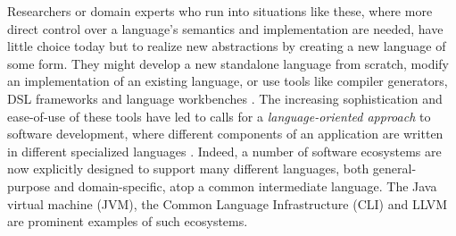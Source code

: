 \documentclass{llncs}
\begin{document}


Researchers or domain experts who run into situations like these, where more direct control over a language's semantics and implementation are needed, have little choice today but to realize new abstractions by creating a new language of some form. They might develop a new standalone language from scratch, modify an implementation of an existing language, or use tools like compiler generators, DSL frameworks and language workbenches \cite{fowler2010domain}. 
The increasing sophistication and ease-of-use of these tools have led to calls for a {\it language-oriented approach} to software development, where different components of an application are written in different specialized languages \cite{journals/stp/Ward94}. Indeed, a number of software ecosystems are now explicitly designed to support many different languages, both general-purpose and domain-specific, atop a common intermediate language. The Java virtual machine (JVM), the Common Language Infrastructure (CLI) and LLVM are prominent examples of such ecosystems.
\end{document}
